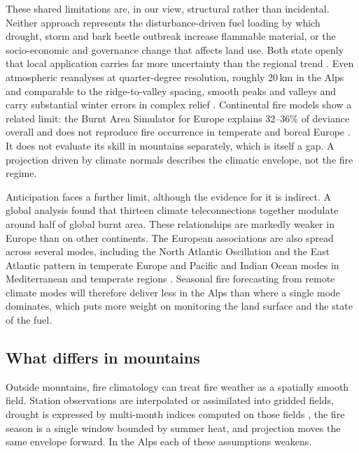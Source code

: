 \documentclass[11pt,a4paper]{article}
\begin{document}
These shared limitations are, in our view, structural rather than incidental. Neither approach represents the disturbance-driven fuel loading by which drought, storm and bark beetle outbreak increase flammable material, or the socio-economic and governance change that affects land use. Both state openly that local application carries far more uncertainty than the regional trend \citep{gerberding_mapping_2025}. Even atmospheric reanalyses at quarter-degree resolution, roughly 20\,km in the Alps and comparable to the ridge-to-valley spacing, smooth peaks and valleys and carry substantial winter errors in complex relief \citep{pepin_climate_2022}. Continental fire models show a related limit: the Burnt Area Simulator for Europe explains 32--36\% of deviance overall and does not reproduce fire occurrence in temperate and boreal Europe \citep{forrest_understanding_2024}. It does not evaluate its skill in mountains separately, which is itself a gap. A projection driven by climate normals describes the climatic envelope, not the fire regime.

Anticipation faces a further limit, although the evidence for it is indirect. A global analysis found that thirteen climate teleconnections together modulate around half of global burnt area. These relationships are markedly weaker in Europe than on other continents. The European associations are also spread across several modes, including the North Atlantic Oscillation and the East Atlantic pattern in temperate Europe and Pacific and Indian Ocean modes in Mediterranean and temperate regions \citep{cardil_climate_2023}. Seasonal fire forecasting from remote climate modes will therefore deliver less in the Alps than where a single mode dominates, which puts more weight on monitoring the land surface and the state of the fuel.

\subsection{What differs in mountains}

Outside mountains, fire climatology can treat fire weather as a spatially smooth field. Station observations are interpolated or assimilated into gridded fields, drought is expressed by multi-month indices computed on those fields \citep{miller_compounding_2025}, the fire season is a single window bounded by summer heat, and projection moves the same envelope forward. In the Alps each of these assumptions weakens.
\end{document}
